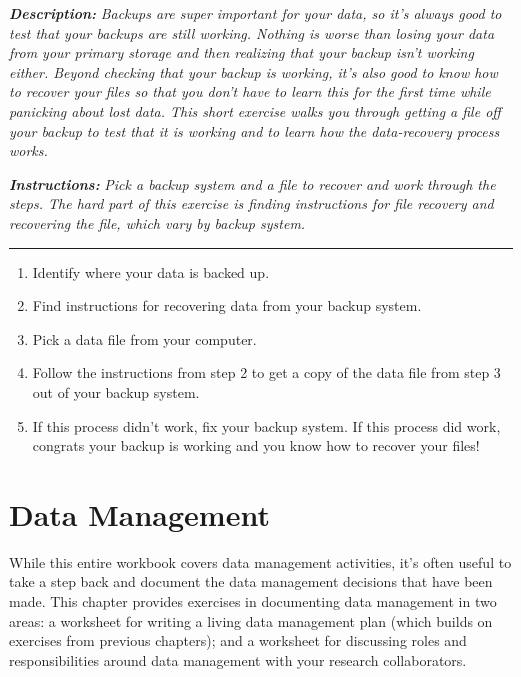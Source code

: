\documentclass[
]{book}
\providecommand{\tightlist}{%
  \setlength{\itemsep}{0pt}\setlength{\parskip}{0pt}}
\begin{document}
\textbf{\emph{Description:}} \emph{Backups are super important for your data, so it's always good to test that your backups are still working. Nothing is worse than losing your data from your primary storage and then realizing that your backup isn't working either. Beyond checking that your backup is working, it's also good to know how to recover your files so that you don't have to learn this for the first time while panicking about lost data. This short exercise walks you through getting a file off your backup to test that it is working and to learn how the data-recovery process works.}

\textbf{\emph{Instructions:}} \emph{Pick a backup system and a file to recover and work through the steps. The hard part of this exercise is finding instructions for file recovery and recovering the file, which vary by backup system.}

\begin{center}\rule{0.5\linewidth}{0.5pt}\end{center}

\begin{enumerate}
\def\labelenumi{\arabic{enumi}.}
\tightlist
\item
  Identify where your data is backed up.
\item
  Find instructions for recovering data from your backup system.
\item
  Pick a data file from your computer.
\item
  Follow the instructions from step 2 to get a copy of the data file from step 3 out of your backup system.
\item
  If this process didn't work, fix your backup system. If this process did work, congrats your backup is working and you know how to recover your files!
\end{enumerate}

\hypertarget{data-management}{%
\chapter{Data Management}\label{data-management}}

While this entire workbook covers data management activities, it's often useful to take a step back and document the data management decisions that have been made. This chapter provides exercises in documenting data management in two areas: a worksheet for writing a living data management plan (which builds on exercises from previous chapters); and a worksheet for discussing roles and responsibilities around data management with your research collaborators.
\end{document}
